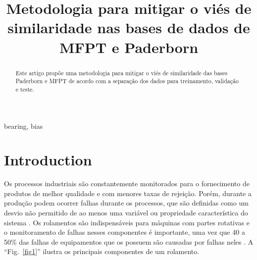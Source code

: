 \documentclass[conference]{IEEEtran}
\begin{document}
\title{Metodologia para mitigar o viés de similaridade nas bases de dados de MFPT e Paderborn\\

}

\author{
\and
{}
\and
{}
}

\maketitle

\begin{abstract}
Este artigo propõe uma metodologia para mitigar o viés de similaridade das bases Paderborn e MFPT de acordo com a separação dos dados para treinamento, validação e teste.
\end{abstract}

\begin{IEEEkeywords}
bearing, bias
\end{IEEEkeywords}

\section{Introduction}
Os processos industriais são constantemente monitorados para o fornecimento de produtos de melhor qualidade e com menores taxas de rejeição.
Porém, durante a produção podem ocorrer falhas durante os processos, que são definidas como um desvio não permitido de ao menos uma variável ou propriedade característica do sistema \cite{b1}.
Os rolamentos são indispensáveis para máquinas com partes rotativas e o monitoramento de falhas nesses componentes é importante, uma vez que 40 a 50\% das falhas de equipamentos que os possuem são causadas por falhas neles \cite{b2}.
A ``Fig.~\ref{fig1}'' ilustra os principais componentes de um rolamento.
\end{document}
